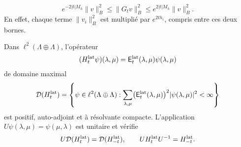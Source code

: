 \begin{equation}
 e^{-2|t|M_h}\|v\|_B^2\leq\|G_tv\|_B^2
                    \leq e^{2|t|M_h}\|v\|_B^2.
 \label{corpus9:xii:cotas-cuadraticas}
\end{equation}
En effet, chaque terme \(\|v_i\|_B^2\) est multiplié par
\(e^{2th_i}\), compris entre ces deux bornes.

\begin{theorem}
\label{corpus9:xii:operador-positivo}
Dans \(\ell^2(\Lambda\oplus\Lambda)\), l’opérateur
\[
 (H_t^{\rm lat}\psi)(\lambda,\mu)
 =\mathsf E_t^{\rm lat}(\lambda,\mu)\psi(\lambda,\mu)
\]
de domaine maximal
\begin{equation}
 \mathcal D(H_t^{\rm lat})=
 \left\{\psi\in\ell^2(\Lambda\oplus\Lambda):
 \sum_{\lambda,\mu}\bigl(\mathsf E_t^{\rm lat}(\lambda,\mu)\bigr)^2
                  |\psi(\lambda,\mu)|^2<\infty\right\}
 \label{corpus9:xii:dominio-operador}
\end{equation}
est positif, auto-adjoint et à résolvante compacte. L’application
\(U\psi(\lambda,\mu)=\psi(\mu,\lambda)\) est unitaire et vérifie
\begin{equation}
 U\mathcal D(H_t^{\rm lat})=\mathcal D(H_{-t}^{\rm lat}),\qquad
 UH_t^{\rm lat}U^{-1}=H_{-t}^{\rm lat}.
 \label{corpus9:xii:equivalencia-unitaria}
\end{equation}
\end{theorem}
